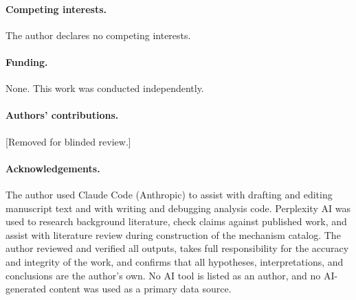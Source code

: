 \documentclass[11pt]{article}
\begin{document}
\paragraph{Competing interests.}
The author declares no competing interests.

\paragraph{Funding.}
None. This work was conducted independently.

\paragraph{Authors' contributions.}
[Removed for blinded review.]

\paragraph{Acknowledgements.}
The author used Claude Code (Anthropic) to assist with drafting and editing manuscript text and with writing and debugging analysis code. Perplexity AI was used to research background literature, check claims against published work, and assist with literature review during construction of the mechanism catalog. The author reviewed and verified all outputs, takes full responsibility for the accuracy and integrity of the work, and confirms that all hypotheses, interpretations, and conclusions are the author's own. No AI tool is listed as an author, and no AI-generated content was used as a primary data source.



\end{document}
